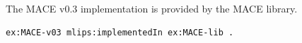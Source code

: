 The MACE v0.3 implementation is provided by the MACE library.
\begin{lstlisting}[language=turtle]
ex:MACE-v03 mlips:implementedIn ex:MACE-lib .
\end{lstlisting}
